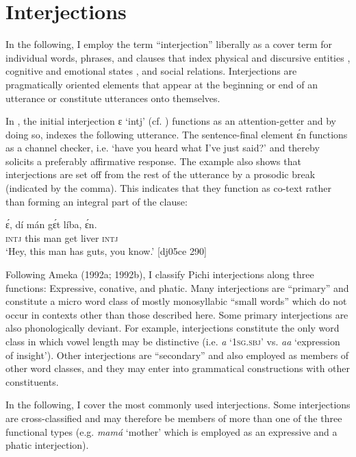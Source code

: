 \section{Interjections}\label{sec:12.2}

In the following, I employ the term “interjection” liberally as a cover term for individual words, phrases, and clauses that index physical and discursive entities \citep{Kockelman2003}, cognitive and emotional states \citep{Ameka1992}, and social relations. Interjections are pragmatically oriented elements that appear at the beginning or end of an utterance or constitute utterances onto themselves.


In , the initial interjection ɛ ‘intj’ (cf. ) functions as an attention-getter and by doing so, indexes the following utterance. The sentence-final element ɛ́n functions as a channel checker, i.e. ‘have you heard what I’ve just said?’ and thereby solicits a preferably affirmative response. The example also shows that interjections are set off from the rest of the utterance by a prosodic break (indicated by the comma). This indicates that they function as co-text rather than forming an integral part of the clause:



\ea%
    \label{ex:key:1635}
    \gll ɛ́,  dí  mán    gɛ́t  líba,    ɛ́n.\\
\textsc{intj}  this  man    get  liver  \textsc{intj}\\

\glt ‘Hey, this man has guts, you know.’ [dj05ce 290]
\z

Following Ameka (1992a; 1992b), I classify Pichi interjections along three functions: Expressive, conative, and phatic. Many interjections are “primary” \citep{Ameka1992a} and constitute a micro word class of mostly monosyllabic “small words” which do not occur in contexts other than those described here. Some primary interjections are also phonologically deviant. For example, interjections constitute the only word class in which vowel length may be distinctive (i.e. \textit{a} ‘\textsc{1sg.sbj}’ vs. \textit{aa} ‘expression of insight’). Other interjections are “secondary” and also employed as members of other word classes, and they may enter into grammatical constructions with other constituents. 


In the following, I cover the most commonly used interjections. Some interjections are cross-classified and may therefore be members of more than one of the three functional types (e.g. \textit{mamá} ‘mother’ which is employed as an expressive and a phatic interjection). 


